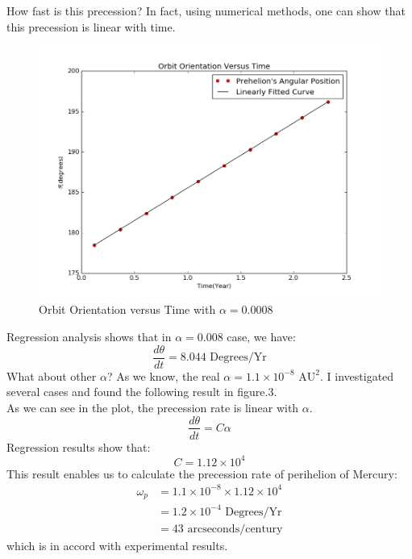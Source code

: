 \documentclass[10pt,a4paper]{article}
\begin{document}
    How fast is this precession? In fact, using numerical methods, one can show that this precession is linear with time.\\
    \begin{figure}[htbp]
    	\centering
    	\includegraphics[width=5in]{Mercury_2.png}
    	\caption{Orbit Orientation versus Time with $\alpha=0.0008$}
    \end{figure}
    Regression analysis shows that in $\alpha=0.008$ case, we have:
    \begin{equation}
    \frac{d\theta}{dt}=8.044\text{ Degrees/Yr}
    \end{equation}
    What about other $\alpha$? As we know, the real $\alpha=1.1\times 10^{-8}\text{ AU}^2$. I investigated several cases and found the following result in figure.3.\\
    As we can see in the plot, the precession rate is linear with $\alpha$. 
    \begin{equation}
    \frac{d\theta}{dt}=C\alpha
    \end{equation}
    Regression results show that:
    \begin{equation}
    C=1.12\times 10^{4}
    \end{equation}
    This result enables us to calculate the precession rate of perihelion of Mercury:
    \begin{align}
    \omega_p&=1.1\times 10^{-8}\times 1.12\times 10^{4}\\
    &=1.2\times 10^{-4}\text{ Degrees/Yr}\\
    &=43\text{ arcseconds/century}
    \end{align}
    which is in accord with experimental results. 
\end{document}
